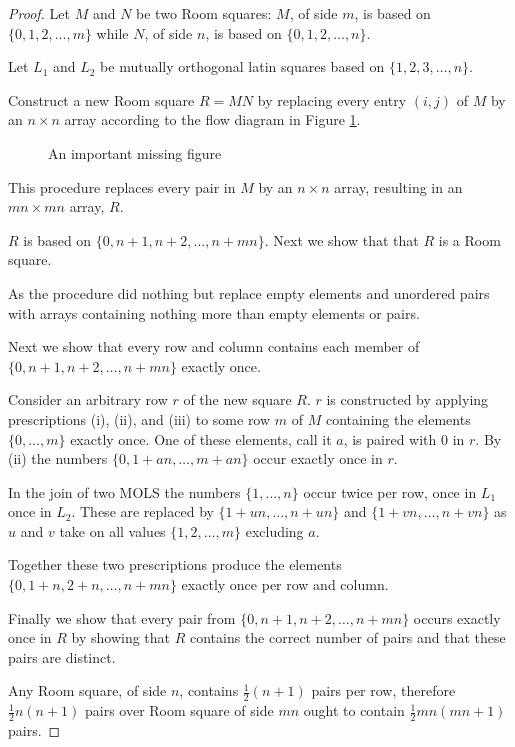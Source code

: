 \begin{proof}
Let $M$ and $N$ be two Room squares: $M$, of side $m$, is based on $\{0, 1, 2, \ldots, m\}$ while $N$, of side $n$, is based on $\{0, 1, 2, \ldots, n\}$.

Let $L_1$ and $L_2$ be mutually orthogonal latin squares based on $\{1, 2, 3, \ldots, n\}$.

Construct a new Room square $R = MN$ by replacing every entry $(i, j)$ of $M$ by an $n \times n$ array according to the flow diagram in Figure \ref{fig:flow}. 

\begin{figure}
\caption{An important missing figure}
\label{fig:flow}
\end{figure}

This procedure replaces every pair in $M$ by an $n \times n$ array, resulting in an $mn \times mn$ array, $R$.

$R$ is based on $\{0, n + 1, n + 2, \ldots, n + mn\}$.
Next we show that that $R$ is a Room square.

As the procedure did nothing but replace empty elements and unordered pairs with arrays containing nothing more than empty elements or pairs.

Next we show that every row and column contains each member of $\{0, n + 1, n + 2, \ldots, n + mn\}$ exactly once.

Consider an arbitrary row $r$ of the new square $R$.
$r$ is constructed by applying prescriptions (i), (ii), and (iii) to some row $m$ of $M$ containing the elements $\{0, \ldots, m\}$ exactly once.
One of these elements, call it $a$, is paired with 0 in $r$.
By (ii) the numbers $\{0, 1 + an, \ldots, m + an\}$ occur exactly once in $r$.

In the join of two MOLS the numbers $\{1, \ldots, n\}$ occur twice per row, once in $L_{1}$ once in $L_{2}$.
These are replaced by $\{1 + un, \ldots, n + un\}$ and $\{1 + vn, \ldots, n + vn\}$ as $u$ and $v$ take on all values $\{1, 2, \ldots, m\}$ excluding $a$.

Together these two prescriptions produce the elements $\{0, 1 + n, 2 + n, \ldots, n + mn\}$ exactly once per row and column.

Finally we show that every pair from $\{0, n + 1, n + 2, \ldots, n + mn\}$ occurs exactly once in $R$ by showing that $R$ contains the correct number of pairs and that these pairs are distinct.

Any Room square, of side $n$, contains $\frac{1}{2}(n + 1)$ pairs per row, therefore $\frac{1}{2}n(n + 1)$ pairs over Room square of side $mn$ ought to contain $\frac{1}{2}mn(mn + 1)$ pairs.


\end{proof}
